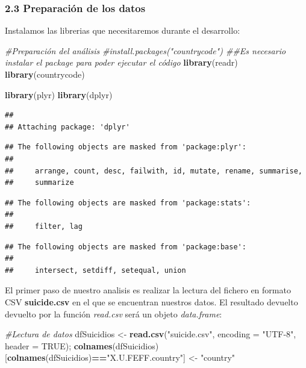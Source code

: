 \documentclass[]{article}
\newenvironment{Shaded}{\begin{snugshade}}{\end{snugshade}}
\newcommand{\CommentTok}[1]{\textcolor[rgb]{0.56,0.35,0.01}{\textit{#1}}}
\newcommand{\DataTypeTok}[1]{\textcolor[rgb]{0.13,0.29,0.53}{#1}}
\newcommand{\KeywordTok}[1]{\textcolor[rgb]{0.13,0.29,0.53}{\textbf{#1}}}
\newcommand{\NormalTok}[1]{#1}
\newcommand{\OperatorTok}[1]{\textcolor[rgb]{0.81,0.36,0.00}{\textbf{#1}}}
\newcommand{\OtherTok}[1]{\textcolor[rgb]{0.56,0.35,0.01}{#1}}
\newcommand{\StringTok}[1]{\textcolor[rgb]{0.31,0.60,0.02}{#1}}
\begin{document}
\hypertarget{preparacion-de-los-datos}{%
\subsubsection{2.3 Preparación de los
datos}\label{preparacion-de-los-datos}}

Instalamos las librerias que necesitaremos durante el desarrollo:

\begin{Shaded}
\begin{Highlighting}[]
\CommentTok{#Preparación del análisis}
\CommentTok{#install.packages("countrycode") ##Es necesario instalar el package para poder ejecutar el código}
\KeywordTok{library}\NormalTok{(readr)}
\KeywordTok{library}\NormalTok{(countrycode)}

\KeywordTok{library}\NormalTok{(plyr)}
\KeywordTok{library}\NormalTok{(dplyr)}
\end{Highlighting}
\end{Shaded}

\begin{verbatim}
## 
## Attaching package: 'dplyr'
\end{verbatim}

\begin{verbatim}
## The following objects are masked from 'package:plyr':
## 
##     arrange, count, desc, failwith, id, mutate, rename, summarise,
##     summarize
\end{verbatim}

\begin{verbatim}
## The following objects are masked from 'package:stats':
## 
##     filter, lag
\end{verbatim}

\begin{verbatim}
## The following objects are masked from 'package:base':
## 
##     intersect, setdiff, setequal, union
\end{verbatim}

El primer paso de nuestro analisis es realizar la lectura del fichero en
formato CSV \textbf{suicide.csv} en el que se encuentran nuestros datos.
El resultado devuelto devuelto por la función \emph{read.csv} será un
objeto \emph{data.frame}:

\begin{Shaded}
\begin{Highlighting}[]
\CommentTok{#Lectura de datos}
\NormalTok{dfSuicidios <-}\StringTok{ }\KeywordTok{read.csv}\NormalTok{(}\StringTok{"suicide.csv"}\NormalTok{, }\DataTypeTok{encoding =} \StringTok{"UTF-8"}\NormalTok{, }\DataTypeTok{header =} \OtherTok{TRUE}\NormalTok{);}
\KeywordTok{colnames}\NormalTok{(dfSuicidios)[}\KeywordTok{colnames}\NormalTok{(dfSuicidios)}\OperatorTok{==}\StringTok{"X.U.FEFF.country"}\NormalTok{] <-}\StringTok{ "country"}
\end{Highlighting}
\end{Shaded}
\end{document}
